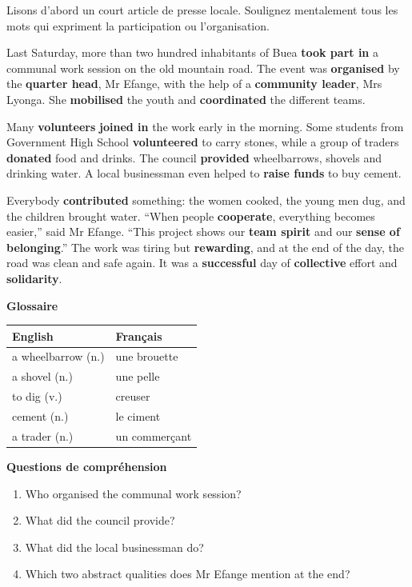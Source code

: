 \documentclass[11pt]{article}
\begin{document}
Lisons d'abord un court article de presse locale. Soulignez mentalement tous les mots qui expriment la participation ou l'organisation.

\begin{textebox}
Last Saturday, more than two hundred inhabitants of Buea \textbf{took part in} a communal work session on the old mountain road. The event was \textbf{organised} by the \textbf{quarter head}, Mr Efange, with the help of a \textbf{community leader}, Mrs Lyonga. She \textbf{mobilised} the youth and \textbf{coordinated} the different teams.

Many \textbf{volunteers} \textbf{joined in} the work early in the morning. Some students from Government High School \textbf{volunteered} to carry stones, while a group of traders \textbf{donated} food and drinks. The council \textbf{provided} wheelbarrows, shovels and drinking water. A local businessman even helped to \textbf{raise funds} to buy cement.

Everybody \textbf{contributed} something: the women cooked, the young men dug, and the children brought water. “When people \textbf{cooperate}, everything becomes easier,” said Mr Efange. “This project shows our \textbf{team spirit} and our \textbf{sense of belonging}.” The work was tiring but \textbf{rewarding}, and at the end of the day, the road was clean and safe again. It was a \textbf{successful} day of \textbf{collective} effort and \textbf{solidarity}.
\end{textebox}

\textbf{Glossaire}

\begin{center}
\begin{tabularx}{\linewidth}{|X|X|}\hline
\rowcolor{popblueL} \textbf{English} & \textbf{Français} \\ \hline
a wheelbarrow (n.) & une brouette \\ \hline
a shovel (n.) & une pelle \\ \hline
to dig (v.) & creuser \\ \hline
cement (n.) & le ciment \\ \hline
a trader (n.) & un commerçant \\ \hline
\end{tabularx}
\end{center}

\textbf{Questions de compréhension}
\begin{enumerate}
\item Who organised the communal work session?
\item What did the council provide?
\item What did the local businessman do?
\item Which two abstract qualities does Mr Efange mention at the end?
\end{enumerate}
\end{document}
